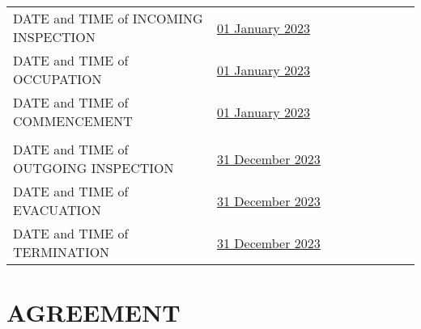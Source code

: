 \documentclass[11pt]{article}
\begin{document}
\begin{table}[ht]
	\centering
	\begin{tabular}{p{0.5\linewidth}p{0.5\linewidth}}
		DATE and TIME of INCOMING INSPECTION & \underline{01 January 2023\hspace{11.2em}} \\
		DATE and TIME of OCCUPATION & \underline{01 January 2023\hspace{11.2em}} \\
		DATE and TIME of COMMENCEMENT & \underline{01 January 2023\hspace{11.2em}} \label{input:commencement-date} \\ \\
		DATE and TIME of OUTGOING INSPECTION & \underline{31 December 2023\hspace{10em}} \\
		DATE and TIME of EVACUATION & \underline{31 December 2023\hspace{10em}} \\
		DATE and TIME of TERMINATION \label{input:termination-date} & \underline{31 December 2023\hspace{10em}} \\
	\end{tabular}
\end{table}


\section{\uppercase{Agreement}}
\label{sec:agreement}
\end{document}
